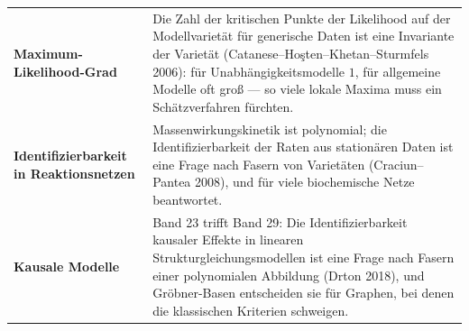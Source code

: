 \begin{forschung}
\begin{center}
{\small
\renewcommand{\arraystretch}{1.45}
\begin{tabular}{@{}P{3.0cm}P{5.2cm}@{}}
\toprule
\textbf{Maximum-Likelihood-Grad} & Die Zahl der kritischen Punkte der Likelihood auf der Modellvarietät für generische Daten ist eine Invariante der Varietät (Catanese--Hoşten--Khetan--Sturmfels 2006): für Unabhängigkeitsmodelle $1$, für allgemeine Modelle oft groß --- so viele lokale Maxima muss ein Schätzverfahren fürchten.\\
\textbf{Identifizierbarkeit in Reaktionsnetzen} & Massenwirkungskinetik ist polynomial; die Identifizierbarkeit der Raten aus stationären Daten ist eine Frage nach Fasern von Varietäten (Craciun--Pantea 2008), und für viele biochemische Netze beantwortet.\\
\textbf{Kausale Modelle} & Band 23 trifft Band 29: Die Identifizierbarkeit kausaler Effekte in linearen Strukturgleichungsmodellen ist eine Frage nach Fasern einer polynomialen Abbildung (Drton 2018), und Gröbner-Basen entscheiden sie für Graphen, bei denen die klassischen Kriterien schweigen.\\
\bottomrule
\end{tabular}}
\end{center}

\begin{center}
\begin{minipage}{0.88\textwidth}
\end{minipage}
\end{center}
\end{forschung}

